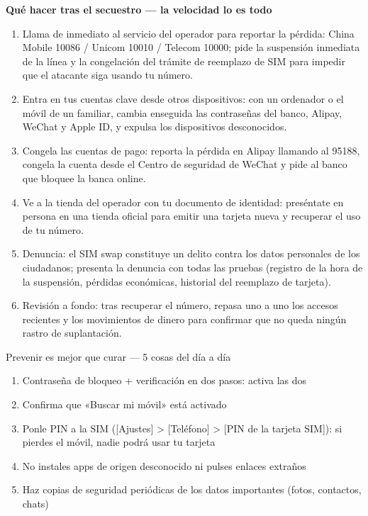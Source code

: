 \textbf{Qué hacer tras el secuestro — la velocidad lo es todo}\par

\begin{enumerate}
  \item Llama de inmediato al servicio del operador para reportar la pérdida: China Mobile 10086 / Unicom 10010 / Telecom 10000; pide la suspensión inmediata de la línea y la congelación del trámite de reemplazo de SIM para impedir que el atacante siga usando tu número.
  \item Entra en tus cuentas clave desde otros dispositivos: con un ordenador o el móvil de un familiar, cambia enseguida las contraseñas del banco, Alipay, WeChat y Apple ID, y expulsa los dispositivos desconocidos.
  \item Congela las cuentas de pago: reporta la pérdida en Alipay llamando al 95188, congela la cuenta desde el Centro de seguridad de WeChat y pide al banco que bloquee la banca online.
  \item Ve a la tienda del operador con tu documento de identidad: preséntate en persona en una tienda oficial para emitir una tarjeta nueva y recuperar el uso de tu número.
  \item Denuncia: el SIM swap constituye un delito contra los datos personales de los ciudadanos; presenta la denuncia con todas las pruebas (registro de la hora de la suspensión, pérdidas económicas, historial del reemplazo de tarjeta).
  \item Revisión a fondo: tras recuperar el número, repasa uno a uno los accesos recientes y los movimientos de dinero para confirmar que no queda ningún rastro de suplantación.
\end{enumerate}

\begin{tcbwarn}{Prevenir es mejor que curar — 5 cosas del día a día}
\begin{enumerate}
  \item Contraseña de bloqueo + verificación en dos pasos: activa las dos
  \item Confirma que «Buscar mi móvil» está activado
  \item Ponle PIN a la SIM ([Ajustes] > [Teléfono] > [PIN de la tarjeta SIM]): si pierdes el móvil, nadie podrá usar tu tarjeta
  \item No instales apps de origen desconocido ni pulses enlaces extraños
  \item Haz copias de seguridad periódicas de los datos importantes (fotos, contactos, chats)
\end{enumerate}

\end{tcbwarn}

